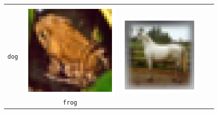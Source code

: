 \begin{figure}[h]
\begin{tabular}{ccccc}
\begin{minipage}[b]{0.15\linewidth}
      \centering\scriptsize\texttt{dog}
    \end{minipage} &
    \begin{minipage}[b]{0.15\linewidth}
      \includegraphics[width=\linewidth]{figures/cifar-images/frog.png}
      \centering\scriptsize\texttt{frog}
    \end{minipage} &
    \begin{minipage}[b]{0.15\linewidth}
      \includegraphics[width=\linewidth]{figures/cifar-images/horse.png}

\end{minipage}
\end{tabular}
\end{figure}
